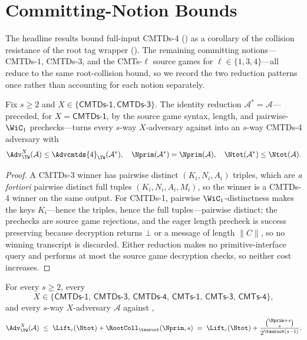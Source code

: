 \section{Committing-Notion Bounds}
\label{app:committing-transfer}

The headline results bound full-input CMTDs-4 () as a
corollary of the collision resistance of the root tag wrapper
(). The remaining \cite{BH22} committing
notions---CMTDs-$1$, CMTDs-$3$, and the CMTs-$\ell$ source games for
$\ell \in \{1,3,4\}$---all reduce to the same root-collision bound, so we
record the two reduction patterns once rather than accounting for each
notion separately.

\begin{lemma}
\label{lem:cmtds-identity-reductions}
Fix $s \geq 2$ and $X \in \{\mathsf{CMTDs\text{-}1},
\mathsf{CMTDs\text{-}3}\}$. The identity reduction
$\mathcal{A}^\ast = \mathcal{A}$---preceded, for
$X = \mathsf{CMTDs\text{-}1}$, by the source game syntax, length, and
pairwise-$\WiC_1$ prechecks---turns every $s$-way $X$-adversary against
\TW{} into an $s$-way CMTDs-4 adversary with
\[
  \Adv^X_\TW(\mathcal{A}) \leq \Advcmtds{4}_\TW(\mathcal{A}^\ast),
  \quad
  \Nprim(\mathcal{A}^\ast) = \Nprim(\mathcal{A}),
  \quad
  \Ntot(\mathcal{A}^\ast) \leq \Ntot(\mathcal{A}).
\]
\end{lemma}

\begin{proof}
A CMTDs-3 winner has pairwise distinct $(K_i,N_i,A_i)$ triples, which are
\emph{a fortiori} pairwise distinct full tuples $(K_i,N_i,A_i,M_i)$, so
the winner is a CMTDs-4 winner on the same output. For CMTDs-1, pairwise
$\WiC_1$-distinctness makes the keys $K_i$---hence the triples, hence the
full tuples---pairwise distinct; the prechecks are source game
rejections, and the eager length precheck is success preserving because
\TW{} decryption returns $\bot$ or a message of length $\|C\|$, so no
winning transcript is discarded. Either reduction makes no
primitive-interface query and performs at most the source game
decryption checks, so neither cost increases.
\end{proof}

\begin{corollary}
\label{cor:committing-combined}
For every $s \geq 2$, every
\[
  X \in \bigl\{\mathsf{CMTDs\text{-}1},\, \mathsf{CMTDs\text{-}3},\,
              \mathsf{CMTDs\text{-}4},\, \mathsf{CMTs\text{-}1},\,
              \mathsf{CMTs\text{-}3},\, \mathsf{CMTs\text{-}4}\bigr\},
\]
and every $s$-way $X$-adversary $\mathcal{A}$ against \TW{},
\[
  \Adv^X_\TW(\mathcal{A})
  \;\leq\;
  \Lift_c(\Ntot) + \RootColl_{\tauroot}(\Nprim, s)
  \;=\;
  \Lift_c(\Ntot) + \frac{\binom{\Nprim + s}{s}}{2^{\tauroot(s-1)}}.
\]
\end{corollary}

